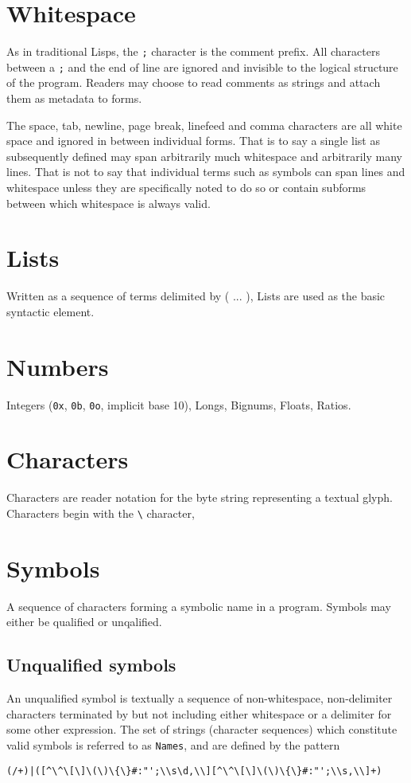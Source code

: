 \documentclass{report}
\begin{document}
\section{Whitespace}


As in traditional Lisps, the \verb|;| character is the comment prefix. All
characters between a \verb|;| and the end of line are ignored and invisible to
the logical structure of the program. Readers may choose to read comments as
strings and attach them as metadata to forms.

The space, tab, newline, page break, linefeed and comma characters are all white
space and ignored in between individual forms. That is to say a single list as
subsequently defined may span arbitrarily much whitespace and arbitrarily many
lines. That is not to say that individual terms such as symbols can span lines
and whitespace unless they are specifically noted to do so or contain subforms
between which whitespace is always valid.

\section{Lists}


Written as a sequence of terms delimited by ( ... ), Lists are used as the basic
syntactic element.

\section{Numbers}


Integers (\verb|0x|, \verb|0b|, \verb|0o|, implicit base 10), Longs, Bignums,
Floats, Ratios.

\section{Characters}


Characters are reader notation for the byte string representing a textual
glyph. Characters begin with the \verb|\| character,\牛

\section{Symbols}


A sequence of characters forming a symbolic name in a program. Symbols may
either be qualified or unqalified.

\subsection{Unqualified symbols}
An unqualified symbol is textually a sequence of non-whitespace, non-delimiter
characters terminated by but not including either whitespace or a delimiter for
some other expression. The set of strings (character sequences) which constitute
valid symbols is referred to as \verb|Names|, and are defined by the pattern
\begin{verbatim}
(/+)|([^\^\[\]\(\)\{\}#:"';\\s\d,\\][^\^\[\]\(\)\{\}#:"';\\s,\\]+)
\end{verbatim}
\end{document}
